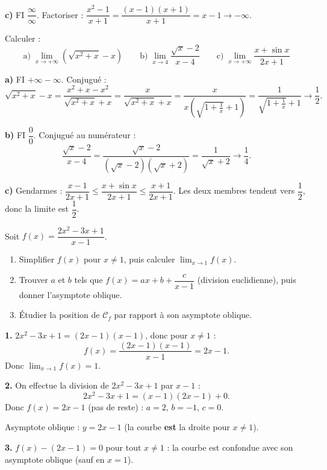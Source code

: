 \textbf{c)} FI $\dfrac{\infty}{\infty}$. Factoriser :
$\dfrac{x^2-1}{x+1}=\dfrac{(x-1)(x+1)}{x+1}=x-1\to-\infty$.

\bigskip
\exercice{\etoilepleine\etoilepleine\etoilevide}
Calculer :
\[
\text{a)}\;\lim_{x\to+\infty}\!\left(\sqrt{x^2+x}-x\right)
\qquad
\text{b)}\;\lim_{x\to 4}\frac{\sqrt{x}-2}{x-4}
\qquad
\text{c)}\;\lim_{x\to+\infty}\frac{x+\sin x}{2x+1}
\]

\solution

\textbf{a)} FI $+\infty-\infty$. Conjugué :
\[
\sqrt{x^2+x}-x
= \frac{x^2+x-x^2}{\sqrt{x^2+x}+x}
= \frac{x}{\sqrt{x^2+x}+x}
= \frac{x}{x(\sqrt{1+\frac{1}{x}}+1)}
= \frac{1}{\sqrt{1+\frac{1}{x}}+1}
\to \frac{1}{2}.
\]

\textbf{b)} FI $\dfrac{0}{0}$. Conjugué au numérateur :
\[
\frac{\sqrt{x}-2}{x-4}
= \frac{\sqrt{x}-2}{(\sqrt{x}-2)(\sqrt{x}+2)}
= \frac{1}{\sqrt{x}+2}
\to \frac{1}{4}.
\]

\textbf{c)} Gendarmes : $\dfrac{x-1}{2x+1}\leq\dfrac{x+\sin x}{2x+1}\leq\dfrac{x+1}{2x+1}$.
Les deux membres tendent vers $\dfrac{1}{2}$, donc la limite est $\dfrac{1}{2}$.

\bigskip
\exercice{\etoilepleine\etoilepleine\etoilepleine}
Soit $f(x)=\dfrac{2x^2-3x+1}{x-1}$.
\begin{enumerate}
	\item Simplifier $f(x)$ pour $x\neq 1$, puis calculer
	$\displaystyle\lim_{x\to 1}f(x)$.
	\item Trouver $a$ et $b$ tels que $f(x)=ax+b+\dfrac{c}{x-1}$
	(division euclidienne), puis donner l'asymptote oblique.
	\item Étudier la position de $\mathcal{C}_f$ par rapport à son asymptote oblique.
\end{enumerate}

\solution

\textbf{1.} $2x^2-3x+1=(2x-1)(x-1)$, donc pour $x\neq 1$ :
\[
f(x)=\frac{(2x-1)(x-1)}{x-1}=2x-1.
\]
Donc $\displaystyle\lim_{x\to 1}f(x)=1$.

\textbf{2.} On effectue la division de $2x^2-3x+1$ par $x-1$ :
\[
2x^2-3x+1 = (x-1)(2x-1)+0.
\]
Donc $f(x)=2x-1$ (pas de reste) : $a=2$, $b=-1$, $c=0$.

Asymptote oblique : $y=2x-1$ (la courbe \textbf{est} la droite pour $x\neq 1$).

\textbf{3.} $f(x)-(2x-1)=0$ pour tout $x\neq 1$ :
la courbe est confondue avec son asymptote oblique (sauf en $x=1$).

